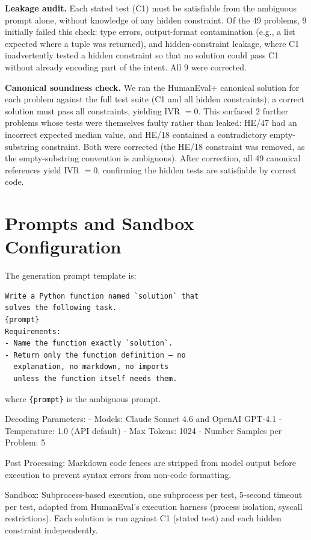 \documentclass[11pt]{article}
\begin{document}
\textbf{Leakage audit.} Each stated test (C1) must be
satisfiable from the ambiguous prompt alone, without
knowledge of any hidden constraint. Of the 49 problems,
9 initially failed this check: type errors, output-format
contamination (e.g., a list expected where a tuple was
returned), and hidden-constraint leakage, where C1
inadvertently tested a hidden constraint so that no
solution could pass C1 without already encoding part of
the intent. All 9 were corrected.

\textbf{Canonical soundness check.} We ran the HumanEval+
canonical solution for each problem against the full test
suite (C1 and all hidden constraints); a correct solution
must pass all constraints, yielding IVR $=0$. This surfaced
2 further problems whose tests were themselves faulty
rather than leaked: HE/47 had an incorrect expected median
value, and HE/18 contained a contradictory empty-substring
constraint. Both were corrected (the HE/18 constraint was
removed, as the empty-substring convention is ambiguous).
After correction, all 49 canonical references yield
IVR $=0$, confirming the hidden tests are satisfiable by
correct code.

\section{Prompts and Sandbox Configuration}
\label{app:prompts}
The generation prompt template is:
\begin{verbatim}
Write a Python function named `solution` that 
solves the following task.
{prompt}
Requirements:
- Name the function exactly `solution`.
- Return only the function definition — no 
  explanation, no markdown, no imports 
  unless the function itself needs them.
\end{verbatim}
where \texttt{\{prompt\}} is the ambiguous prompt.

Decoding Parameters: 
- Models: Claude Sonnet 4.6 and OpenAI GPT-4.1
- Temperature: 1.0 (API default)
- Max Tokens: 1024 
- Number Samples per Problem: 5 

Post Processing: Markdown code fences are stripped from model output before execution to prevent syntax errors from non-code formatting.

Sandbox: Subprocess-based execution, one subprocess per test, 5-second timeout per test, adapted from HumanEval's execution harness (process isolation, syscall restrictions). Each solution is run against C1 (stated test) and each hidden constraint independently. 
\end{document}
